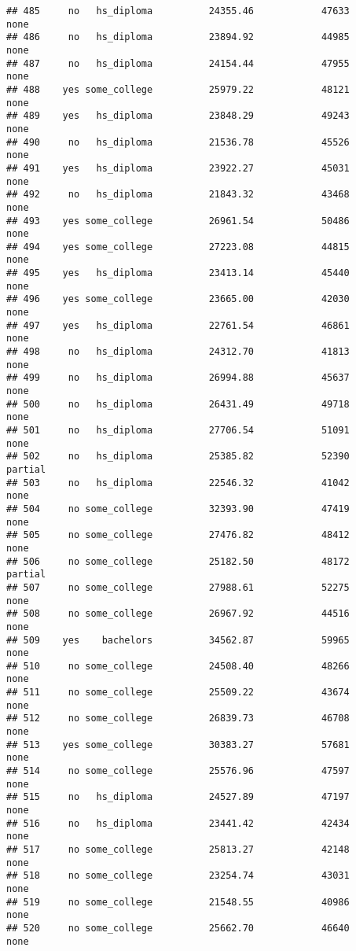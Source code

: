 \documentclass[
]{article}
\begin{document}
\begin{verbatim}
## 485     no   hs_diploma          24355.46            47633        none
## 486     no   hs_diploma          23894.92            44985        none
## 487     no   hs_diploma          24154.44            47955        none
## 488    yes some_college          25979.22            48121        none
## 489    yes   hs_diploma          23848.29            49243        none
## 490     no   hs_diploma          21536.78            45526        none
## 491    yes   hs_diploma          23922.27            45031        none
## 492     no   hs_diploma          21843.32            43468        none
## 493    yes some_college          26961.54            50486        none
## 494    yes some_college          27223.08            44815        none
## 495    yes   hs_diploma          23413.14            45440        none
## 496    yes some_college          23665.00            42030        none
## 497    yes   hs_diploma          22761.54            46861        none
## 498     no   hs_diploma          24312.70            41813        none
## 499     no   hs_diploma          26994.88            45637        none
## 500     no   hs_diploma          26431.49            49718        none
## 501     no   hs_diploma          27706.54            51091        none
## 502     no   hs_diploma          25385.82            52390     partial
## 503     no   hs_diploma          22546.32            41042        none
## 504     no some_college          32393.90            47419        none
## 505     no some_college          27476.82            48412        none
## 506     no some_college          25182.50            48172     partial
## 507     no some_college          27988.61            52275        none
## 508     no some_college          26967.92            44516        none
## 509    yes    bachelors          34562.87            59965        none
## 510     no some_college          24508.40            48266        none
## 511     no some_college          25509.22            43674        none
## 512     no some_college          26839.73            46708        none
## 513    yes some_college          30383.27            57681        none
## 514     no some_college          25576.96            47597        none
## 515     no   hs_diploma          24527.89            47197        none
## 516     no   hs_diploma          23441.42            42434        none
## 517     no some_college          25813.27            42148        none
## 518     no some_college          23254.74            43031        none
## 519     no some_college          21548.55            40986        none
## 520     no some_college          25662.70            46640        none

\end{verbatim}
\end{document}
